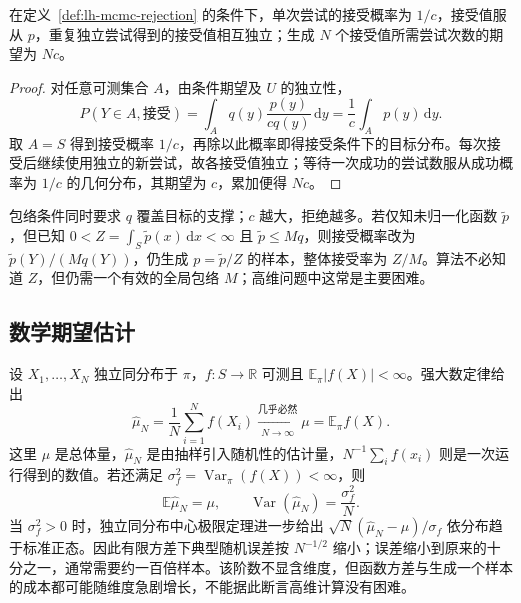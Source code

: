 \begin{proposition}[接受值的分布与抽样代价]
\label{prop:lh-mcmc-rejection-correctness}
在定义~\ref{def:lh-mcmc-rejection} 的条件下，单次尝试的接受概率为 $1/c$，接受值服从 $p$，重复独立尝试得到的接受值相互独立；生成 $N$ 个接受值所需尝试次数的期望为 $Nc$。
\end{proposition}
\begin{proof}
对任意可测集合 $A$，由条件期望及 $U$ 的独立性，
\[
P(Y\in A,\text{接受})
=\int_A q(y)\frac{p(y)}{c q(y)}\,\mathrm dy
=\frac1c\int_A p(y)\,\mathrm dy.
\]
取 $A=S$ 得到接受概率 $1/c$，再除以此概率即得接受条件下的目标分布。每次接受后继续使用独立的新尝试，故各接受值独立；等待一次成功的尝试数服从成功概率为 $1/c$ 的几何分布，其期望为 $c$，累加便得 $Nc$。
\end{proof}

包络条件同时要求 $q$ 覆盖目标的支撑；$c$ 越大，拒绝越多。若仅知未归一化函数 $\widetilde p$，但已知 $0<Z=\int_S\widetilde p(x)\,\mathrm dx<\infty$ 且 $\widetilde p\leq Mq$，则接受概率改为 $\widetilde p(Y)/(Mq(Y))$，仍生成 $p=\widetilde p/Z$ 的样本，整体接受率为 $Z/M$。算法不必知道 $Z$，但仍需一个有效的全局包络 $M$；高维问题中这常是主要困难。

\subsection{数学期望估计}
\label{subsec:lh-mcmc-expectation}

设 $X_1,\ldots,X_N$ 独立同分布于 $\pi$，$f:S\to\mathbb R$ 可测且 $\mathbb E_\pi|f(X)|<\infty$。强大数定律给出
\begin{equation}
\widehat\mu_N=\frac1N\sum_{i=1}^N f(X_i)
\xrightarrow[N\to\infty]{\text{几乎必然}}
\mu=\mathbb E_\pi f(X).
\label{eq:lh-mcmc-iid-law}
\end{equation}
这里 $\mu$ 是总体量，$\widehat\mu_N$ 是由抽样引入随机性的估计量，$N^{-1}\sum_i f(x_i)$ 则是一次运行得到的数值。若还满足 $\sigma_f^2=\operatorname{Var}_\pi(f(X))<\infty$，则
\begin{equation}
\mathbb E\widehat\mu_N=\mu,\qquad
\operatorname{Var}(\widehat\mu_N)=\frac{\sigma_f^2}{N}.
\label{eq:lh-mcmc-iid-variance}
\end{equation}
当 $\sigma_f^2>0$ 时，独立同分布中心极限定理进一步给出 $\sqrt N(\widehat\mu_N-\mu)/\sigma_f$ 依分布趋于标准正态。因此有限方差下典型随机误差按 $N^{-1/2}$ 缩小；误差缩小到原来的十分之一，通常需要约一百倍样本。该阶数不显含维度，但函数方差与生成一个样本的成本都可能随维度急剧增长，不能据此断言高维计算没有困难。

